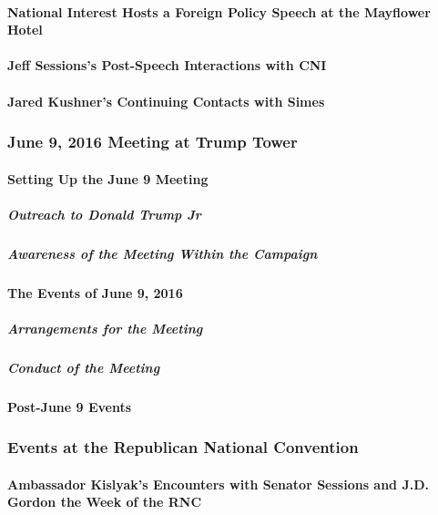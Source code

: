 \paragraph{National Interest Hosts a Foreign Policy Speech at the Mayflower Hotel}

\paragraph{Jeff Sessions's Post-Speech Interactions with CNI}

\paragraph{Jared Kushner's Continuing Contacts with Simes}

\subsubsection{June 9, 2016 Meeting at Trump Tower}

\paragraph{Setting Up the June 9 Meeting}

\subparagraph{Outreach to Donald Trump Jr}

\subparagraph{Awareness of the Meeting Within the Campaign}

\paragraph{The Events of June 9, 2016}

\subparagraph{Arrangements for the Meeting}

\subparagraph{Conduct of the Meeting}

\paragraph{Post-June 9 Events}

\subsubsection{Events at the Republican National Convention}

\paragraph{Ambassador Kislyak's Encounters with Senator Sessions and J.D. Gordon the Week of the RNC}

